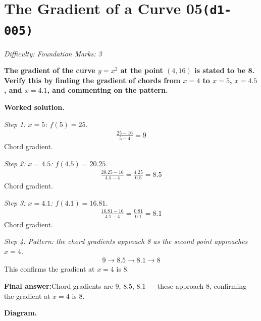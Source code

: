 \documentclass[11pt]{article}
\newcommand{\question}[1]{\par\medskip\noindent\textbf{#1}\par}
\begin{document}
\section*{The Gradient of a Curve 05\quad\small\texttt{(d1-005)}}
\textit{Difficulty: Foundation \quad\textbar\quad Marks: 3}

\question{The gradient of the curve \( y = x^2 \) at the point \( (4, 16) \) is stated to be 8.\\[3pt]  Verify this by finding the gradient of chords from \( x = 4 \) to \( x = 5 \), \( x = 4.5 \), and \( x = 4.1 \), and commenting on the pattern.}

\textbf{Worked solution.}

\textit{Step 1: \( x = 5 \): \( f(5) = 25 \).}
\[\begin{gathered}
\frac{25 - 16}{5 - 4} = 9
\end{gathered}\]
Chord gradient.

\textit{Step 2: \( x = 4.5 \): \( f(4.5) = 20.25 \).}
\[\begin{gathered}
\frac{20.25 - 16}{4.5 - 4} = \frac{4.25}{0.5} = 8.5
\end{gathered}\]
Chord gradient.

\textit{Step 3: \( x = 4.1 \): \( f(4.1) = 16.81 \).}
\[\begin{gathered}
\frac{16.81 - 16}{4.1 - 4} = \frac{0.81}{0.1} = 8.1
\end{gathered}\]
Chord gradient.

\textit{Step 4: Pattern: the chord gradients approach 8 as the second point approaches \( x = 4 \).}
\[\begin{gathered}
9 \to 8.5 \to 8.1 \to 8
\end{gathered}\]
This confirms the gradient at \( x = 4 \) is 8.

\begin{answerbox}
\textbf{Final answer:}\quad Chord gradients are 9, 8.5, 8.1 --- these approach 8, confirming the gradient at \(\displaystyle  x = 4 \) is 8.
\end{answerbox}
\textbf{Diagram.}
\end{document}

